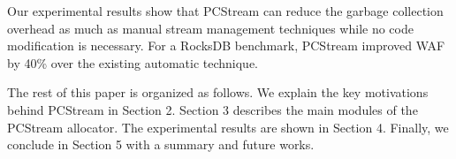 Our experimental results show that {\sf PCStream} can reduce the
garbage collection overhead as much as manual stream
management techniques while no code modification is necessary.
For a RocksDB benchmark, {\sf PCStream} improved WAF by 40\% over 
the existing automatic technique.

The rest of this paper is organized as follows. 
We explain the key motivations behind {\sf PCStream} in Section 2. 
Section 3 describes the main modules of the {\sf PCStream} allocator.
The experimental results are shown in Section 4. 
Finally, we conclude in Section 5 with a summary and future works. 

\begin{comment}
...
Recent studies have used two strategies to utilize the stream feature.
One is to classify the application data into different streams based on an understanding
of the expected lifetime of those data~\cite{MultiStream},~\cite{FStream}. 
This manual stream assignment requires the programmer or system manager to 
fully understand the lifetime characteristics of the data, such as different levels
of a log-structured merge tree or the file extension of commitlog file.
Also when multiple applications try to assign streams, a centralized stream assignment
is required to avoid conflicts.
The other is to automate the process of mapping write I/O operations to an SSD stream~\cite{AutoStream}.
However, since AutoStream relies on the past LBA access patterns, 
it is not practical when the data are written in append-only manner, e.g. RocksDB or Cassandra.

Usually, the lifetime of data is determined by its purpose.
For example, files such as the write ahead log in RocksDB are quickly deleted, 
while write-once data is kept at the bottom level of the LSM-tree for a long time.
Our approach is motivated by the observation that the purpose of the application can be defined as
the execution path of function calls that lead to a write system call, called program context.
In this paper, we take the program context information as a lifetime hint for the automatic stream allocation. 
\end{comment}

